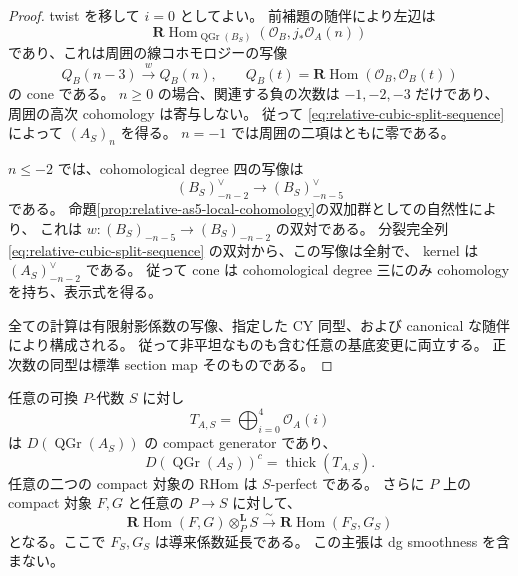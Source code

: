 \begin{proof}
twist を移して $i=0$ としてよい。
前補題の随伴により左辺は
\[
 \mathbf R\operatorname{Hom}_{\operatorname{QGr}(B_S)}
       (\mathcal O_B,j_*\mathcal O_A(n))
\]
であり、これは周囲の線コホモロジーの写像
\[
 Q_B(n-3)\xrightarrow{\,w\,}Q_B(n),\qquad
 Q_B(t)=\mathbf R\operatorname{Hom}(\mathcal O_B,\mathcal O_B(t))
\]
の cone である。
$n\geq0$ の場合、関連する負の次数は $-1,-2,-3$ だけであり、
周囲の高次 cohomology は寄与しない。
従って \eqref{eq:relative-cubic-split-sequence} によって $(A_S)_n$ を得る。
$n=-1$ では周囲の二項はともに零である。

$n\leq-2$ では、cohomological degree 四の写像は
\[
 (B_S)_{-n-2}^\vee\longrightarrow (B_S)_{-n-5}^\vee
\]
である。
命題\ref{prop:relative-as5-local-cohomology}の双加群としての自然性により、
これは $w:(B_S)_{-n-5}\to(B_S)_{-n-2}$ の双対である。
分裂完全列 \eqref{eq:relative-cubic-split-sequence} の双対から、この写像は全射で、
kernel は $(A_S)_{-n-2}^\vee$ である。
従って cone は cohomological degree 三にのみ cohomology を持ち、表示式を得る。

全ての計算は有限射影係数の写像、指定した CY 同型、および canonical な随伴により構成される。
従って非平坦なものも含む任意の基底変更に両立する。
正次数の同型は標準 section map そのものである。
\end{proof}

\begin{corollary}
\label{cor:relative-cubic-compact-proper}
任意の可換 $P$-代数 $S$ に対し
\[
 T_{A,S}=\bigoplus_{i=0}^4\mathcal O_A(i)
\]
は $D(\operatorname{QGr}(A_S))$ の compact generator であり、
\[
 D(\operatorname{QGr}(A_S))^c=\operatorname{thick}(T_{A,S}).
\]
任意の二つの compact 対象の RHom は $S$-perfect である。
さらに $P$ 上の compact 対象 $F,G$ と任意の $P\to S$ に対して、
\[
 \mathbf R\operatorname{Hom}(F,G)\otimes_P^{\mathbf L}S
 \xrightarrow{\sim}
 \mathbf R\operatorname{Hom}(F_S,G_S)
\]
となる。ここで $F_S,G_S$ は導来係数延長である。
この主張は dg smoothness を含まない。
\end{corollary}

